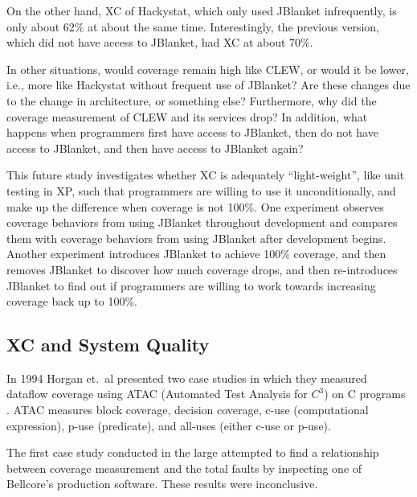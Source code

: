 On the other hand, XC of Hackystat, which only used JBlanket infrequently,
is only about 62\% at about the same time.  Interestingly, the previous
version, which did not have access to JBlanket, had XC at about 70\%.

In other situations, would coverage remain high like CLEW, or would it be
lower, i.e., more like Hackystat without frequent use of JBlanket?  Are
these changes due to the change in architecture, or something else?
Furthermore, why did the coverage measurement of CLEW and its services
drop?  In addition, what happens when programmers first have access to
JBlanket, then do not have access to JBlanket, and then have access to
JBlanket again?

This future study investigates whether XC is adequately ``light-weight'',
like unit testing in XP, such that programmers are willing to use it
unconditionally, and make up the difference when coverage is not 100\%.
One experiment observes coverage behaviors from using JBlanket throughout
development and compares them with coverage behaviors from using JBlanket
after development begins.  Another experiment introduces JBlanket to
achieve 100\% coverage, and then removes JBlanket to discover how much
coverage drops, and then re-introduces JBlanket to find out if programmers
are willing to work towards increasing coverage back up to 100\%.

\subsection{XC and System Quality}
In 1994 Horgan et.~al presented two case studies in which they measured
dataflow coverage using ATAC (Automated Test Analysis for $C^3$) on C
programs \cite{Horgan:1994}.  ATAC measures block coverage, decision
coverage, c-use (computational expression), p-use (predicate), and all-uses
(either c-use or p-use).

The first case study conducted in the large attempted to find a
relationship between coverage measurement and the total faults by
inspecting one of Bellcore's production software.  These results were
inconclusive.


